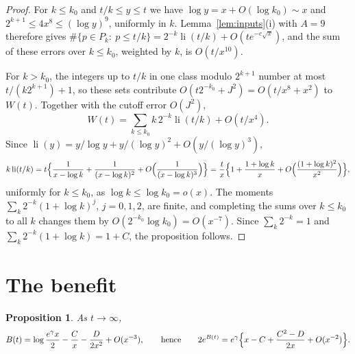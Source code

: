 \documentclass[11pt]{amsart}
\newtheorem{proposition}[theorem]{Proposition}
\theoremstyle{remark}
\numberwithin{equation}{section}
\DeclareMathOperator{\li}{li}
\begin{document}
\begin{proof}
For $k\le k_0$ and $t/k\le y\le t$ we have $\log y=x+O(\log k_0)\sim x$ and
$2^{k+1}\le4x^8\le(\log y)^9$, uniformly in $k$. Lemma~\ref{lem:inputs}(i)
with $A=9$ therefore gives
$\#\{p\in P_k:\ p\le t/k\}=2^{-k}\li(t/k)+O(te^{-c\sqrt x})$, and the sum
of these errors over $k\le k_0$, weighted by $k$, is $O(t/x^{10})$.

For $k>k_0$, the integers up to $t/k$ in one class modulo $2^{k+1}$ number
at most $t/(k2^{k+1})+1$, so these sets contribute
$O(t2^{-k_0}+J^2)=O(t/x^8+x^2)$ to $W(t)$. Together with the cutoff error
$O(J^2)$,
\[
W(t)=\sum_{k\le k_0}k\,2^{-k}\li(t/k)+O(t/x^4).
\]
Since $\li(y)=y/\log y+y/(\log y)^2+O(y/(\log y)^3)$,
\[
k\li(t/k)=t\Bigl\{\frac1{x-\log k}+\frac1{(x-\log k)^2}+O\Bigl(\frac1{(x-\log k)^3}\Bigr)\Bigr\}
=\frac tx\Bigl\{1+\frac{1+\log k}{x}+O\Bigl(\frac{(1+\log k)^2}{x^2}\Bigr)\Bigr\},
\]
uniformly for $k\le k_0$, as $\log k\le\log k_0=o(x)$. The moments
$\sum_k2^{-k}(1+\log k)^j$, $j=0,1,2$, are finite, and completing the sums over
$k\le k_0$ to all $k$ changes them by $O(2^{-k_0}\log k_0)=O(x^{-7})$. Since
$\sum_k2^{-k}=1$ and $\sum_k2^{-k}(1+\log k)=1+C$, the proposition
follows.
\end{proof}

\section{The benefit}\label{sec:benefit}

\begin{proposition}\label{prop:benefit}
As $t\to\infty$,
\[
B(t)=\log\frac{e^\gamma x}{2}-\frac Cx-\frac{D}{2x^2}+O(x^{-3}),
\qquad\text{hence}\qquad
2e^{B(t)}=e^\gamma\Bigl\{x-C+\frac{C^2-D}{2x}+O(x^{-2})\Bigr\}.
\]
\end{proposition}
\end{document}
